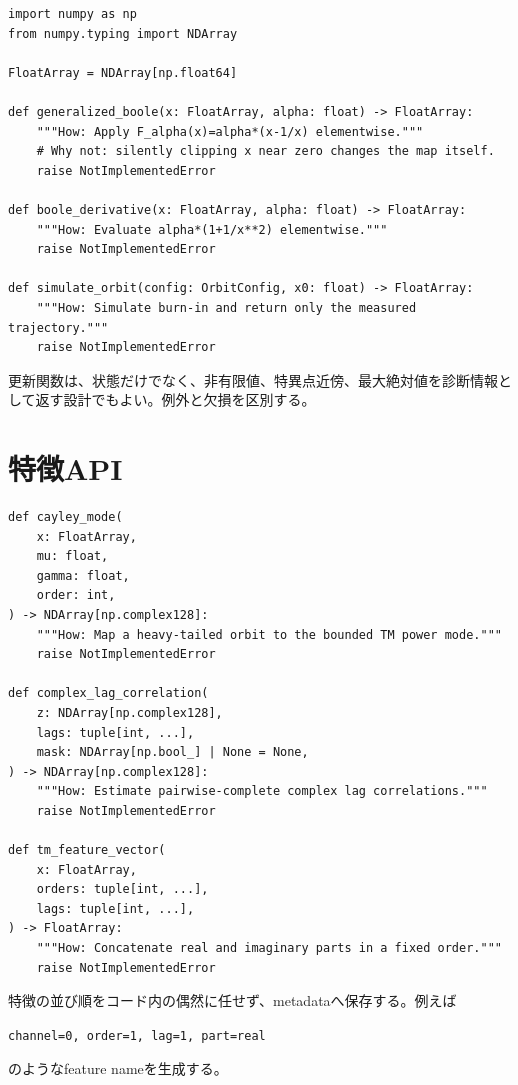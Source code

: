 \documentclass[a4paper,11pt,oneside,openany]{ltjsbook}
\newcommand{\code}[1]{\texttt{#1}}
\begin{document}
\begin{lstlisting}[style=pythonstyle,caption={局所写像APIの契約。}]
import numpy as np
from numpy.typing import NDArray

FloatArray = NDArray[np.float64]

def generalized_boole(x: FloatArray, alpha: float) -> FloatArray:
    """How: Apply F_alpha(x)=alpha*(x-1/x) elementwise."""
    # Why not: silently clipping x near zero changes the map itself.
    raise NotImplementedError

def boole_derivative(x: FloatArray, alpha: float) -> FloatArray:
    """How: Evaluate alpha*(1+1/x**2) elementwise."""
    raise NotImplementedError

def simulate_orbit(config: OrbitConfig, x0: float) -> FloatArray:
    """How: Simulate burn-in and return only the measured trajectory."""
    raise NotImplementedError
\end{lstlisting}

更新関数は、状態だけでなく、非有限値、特異点近傍、最大絶対値を診断情報として返す設計でもよい。例外と欠損を区別する。

\section{特徴API}

\begin{lstlisting}[style=pythonstyle,caption={TM特徴APIの契約。}]
def cayley_mode(
    x: FloatArray,
    mu: float,
    gamma: float,
    order: int,
) -> NDArray[np.complex128]:
    """How: Map a heavy-tailed orbit to the bounded TM power mode."""
    raise NotImplementedError

def complex_lag_correlation(
    z: NDArray[np.complex128],
    lags: tuple[int, ...],
    mask: NDArray[np.bool_] | None = None,
) -> NDArray[np.complex128]:
    """How: Estimate pairwise-complete complex lag correlations."""
    raise NotImplementedError

def tm_feature_vector(
    x: FloatArray,
    orders: tuple[int, ...],
    lags: tuple[int, ...],
) -> FloatArray:
    """How: Concatenate real and imaginary parts in a fixed order."""
    raise NotImplementedError
\end{lstlisting}

特徴の並び順をコード内の偶然に任せず、metadataへ保存する。例えば
\begin{center}
\code{channel=0, order=1, lag=1, part=real}
\end{center}
のようなfeature nameを生成する。
\end{document}
